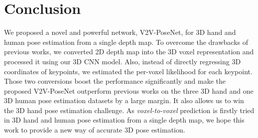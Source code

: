 \section{Conclusion}
We proposed a novel and powerful network, V2V-PoseNet, for 3D hand and human pose estimation from a single depth map. To overcome the drawbacks of previous works, we converted 2D depth map into the 3D voxel representation and processed it using our 3D CNN model. Also, instead of directly regressing 3D coordinates of keypoints, we estimated the per-voxel likelihood for each keypoint. Those two conversions boost the performance significantly and make the proposed V2V-PoseNet outperform previous works on the three 3D hand and one 3D human pose estimation datasets by a large margin. It also allows us to win the 3D hand pose estimation challenge. As \emph{voxel-to-voxel} prediction is firstly tried in 3D hand and human pose estimation from a single depth map, we hope this work to provide a new way of accurate 3D pose estimation.